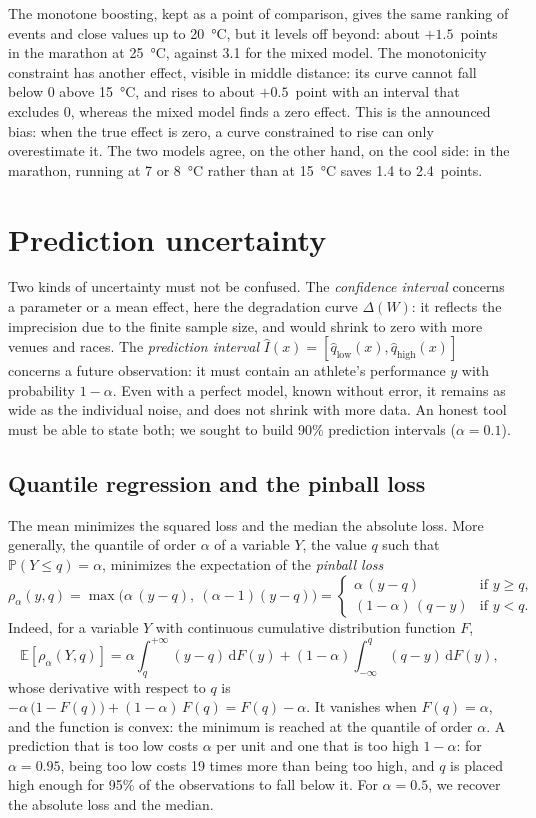 \documentclass[11pt,a4paper]{article}
\newcommand{\E}{\mathbb{E}}
\newcommand{\dd}{\mathrm{d}}
\begin{document}
The monotone boosting, kept as a point of comparison, gives the same ranking of events and close values up to 20~°C,
but it levels off beyond: about $+1.5$~points in the marathon at 25~°C, against 3.1 for the mixed model. The
monotonicity constraint has another effect, visible in middle distance: its curve cannot fall below 0 above 15~°C, and
rises to about $+0.5$~point with an interval that excludes 0, whereas the mixed model finds a zero effect. This is the
announced bias: when the true effect is zero, a curve constrained to rise can only overestimate it. The two models agree,
on the other hand, on the cool side: in the marathon, running at 7 or 8~°C rather than at 15~°C saves 1.4 to
2.4~points.

\section{Prediction uncertainty}\label{sec:uncertainty}

Two kinds of uncertainty must not be confused. The \emph{confidence interval} concerns a parameter or a mean effect,
here the degradation curve $\Delta(W)$: it reflects the imprecision due to the finite sample size, and would shrink to
zero with more venues and races. The \emph{prediction interval}
$\hat I(x) = [\hat q_{\text{low}}(x), \hat q_{\text{high}}(x)]$ concerns a future observation: it must contain an
athlete's performance $y$ with probability $1 - \alpha$. Even with a perfect model, known without error, it remains as
wide as the individual noise, and does not shrink with more data. An honest tool must be able to state both; we sought
to build 90\% prediction intervals ($\alpha = 0.1$).

\subsection{Quantile regression and the pinball loss}\label{sec:pinball}

The mean minimizes the squared loss and the median the absolute loss. More generally, the quantile of order $\alpha$ of
a variable $Y$, the value $q$ such that $\mathbb{P}(Y \leq q) = \alpha$, minimizes the expectation of the
\emph{pinball loss}
\[
\rho_\alpha(y, q) = \max\big(\alpha\,(y - q),\ (\alpha - 1)(y - q)\big) =
\begin{cases} \alpha\,(y - q) & \text{if } y \geq q, \\ (1 - \alpha)\,(q - y) & \text{if } y < q. \end{cases}
\]
Indeed, for a variable $Y$ with continuous cumulative distribution function $F$,
\[
\E[\rho_\alpha(Y, q)] = \alpha\int_{q}^{+\infty}(y - q)\,\dd F(y) + (1 - \alpha)\int_{-\infty}^{q}(q - y)\,\dd F(y),
\]
whose derivative with respect to $q$ is $-\alpha\,\big(1 - F(q)\big) + (1 - \alpha)\,F(q) = F(q) - \alpha$. It vanishes
when $F(q) = \alpha$, and the function is convex: the minimum is reached at the quantile of order $\alpha$. A
prediction that is too low costs $\alpha$ per unit and one that is too high $1 - \alpha$: for $\alpha = 0.95$, being too
low costs 19 times more than being too high, and $q$ is placed high enough for 95\% of the observations to fall below
it. For $\alpha = 0.5$, we recover the absolute loss and the median.
\end{document}
